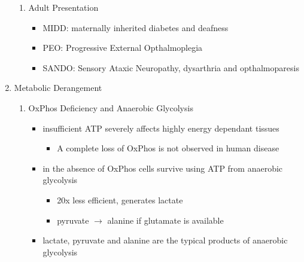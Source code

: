 \documentclass{scrartcl}
\begin{document}
\begin{enumerate}
\begin{enumerate}
\item Adult Presentation
\label{sec:org8601478}
\begin{itemize}
\item MIDD: maternally inherited diabetes and deafness
\item PEO: Progressive External Opthalmoplegia
\item SANDO: Sensory Ataxic Neuropathy, dysarthria and opthalmoparesis
\end{itemize}
\end{enumerate}

\item Metabolic Derangement
\label{sec:orgc3b0aa8}
\begin{enumerate}
\item OxPhos Deficiency and Anaerobic Glycolysis
\label{sec:orgde83983}
\begin{itemize}
\item insufficient ATP severely affects highly energy dependant tissues
\begin{itemize}
\item A complete loss of OxPhos is not observed in human disease
\end{itemize}
\item in the absence of OxPhos cells survive using ATP from anaerobic glycolysis
\begin{itemize}
\item 20x less efficient, generates lactate
\item pyruvate \(\to\) alanine if glutamate is available
\end{itemize}
\item lactate, pyruvate and alanine are the typical products of anaerobic glycolysis
\end{itemize}


\end{enumerate}
\end{enumerate}
\end{document}
